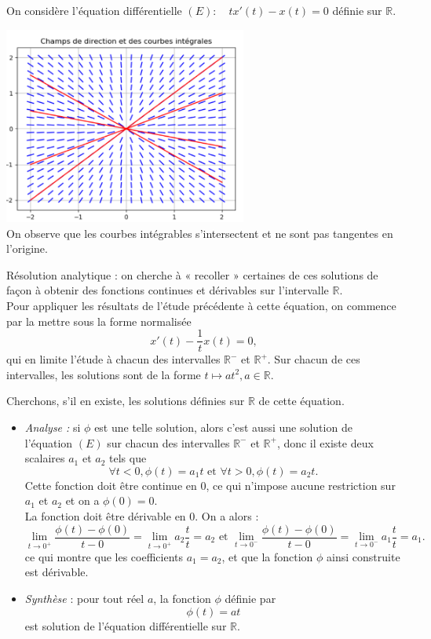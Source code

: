 \documentclass{book}
\begin{document}
\begin{Exemple}  On considère l'équation différentielle $(E):\quad tx'(t)  -x(t)=0$ définie sur $\mathbb{R}$. 
\begin{center}
\includegraphics[width=8cm]{C7_equation_differentielle_raccord2.png}\\
On observe que les courbes intégrables s'intersectent et ne sont pas tangentes en l'origine.
\end{center}
Résolution analytique : on cherche à « recoller » certaines de ces solutions de façon à obtenir des fonctions continues et dérivables sur
l'intervalle $\mathbb{R}$.\\
Pour appliquer les résultats de l'étude précédente à cette équation, on commence par la mettre sous la forme normalisée
$$ x'(t)  -\frac{1}{t}x(t)=0,$$
qui en limite l'étude à chacun des intervalles $\mathbb{R}^-$ et $\mathbb{R}^+$. Sur chacun de ces intervalles, les solutions sont
de la forme $t \mapsto at^2, a \in  \mathbb{R}$.

Cherchons, s'il en existe, les solutions définies sur $\mathbb{R}$ de cette équation.
\begin{itemize}
\item \textit{Analyse :} si $\phi  $ est une telle solution, alors c'est aussi une solution de l'équation $(E)$ sur chacun des
intervalles $\mathbb{R}^-$ et $\mathbb{R}^+$, donc il existe deux scalaires $a_1$ et $a_2$ tels que
$$\forall t < 0, \phi  (t) = a_1 t\text{ et } \forall t > 0, \phi  (t) = a_2 t.$$
Cette fonction doit être continue en 0, ce qui n'impose aucune restriction sur $a_1$ et $a_2$ et on a $\phi  (0) = 0$.\\
La fonction doit être dérivable en 0. On a alors :
$$\lim_{t\to 0^+} \frac{\phi  (t) - \phi  (0)}{t - 0}= \lim_{t\to 0^+}a_2 \frac{t}{t}=a_2 \text{ et } \lim_{t\to 0^-} \frac{\phi  (t) - \phi  (0)}{t - 0}= \lim_{t\to 0^-}a_1 \frac{t}{t}=a_1.$$
ce qui montre que les coefficients $a_1=a_2$, et que la fonction $\phi  $ ainsi construite est dérivable.\\
\item  \textit{Synthèse} : pour tout réel $a$, la fonction $\phi  $ définie par
$$\phi  (t) =a t  $$
est solution de l'équation différentielle sur $\mathbb{R}$.
\end{itemize}
\end{Exemple}
\end{document}
